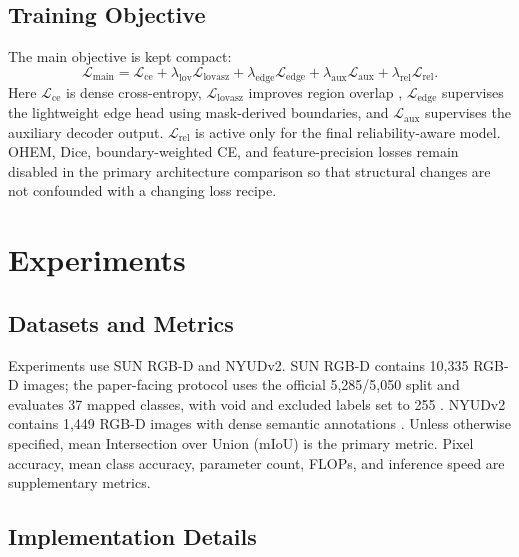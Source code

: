 \documentclass[a4paper,fleqn]{cas-dc}
\begin{document}
\subsection{Training Objective}

The main objective is kept compact:
\begin{equation}
  \mathcal{L}_{\mathrm{main}}
  =
  \mathcal{L}_{\mathrm{ce}}
  +\lambda_{\mathrm{lov}}\mathcal{L}_{\mathrm{lovasz}}
  +\lambda_{\mathrm{edge}}\mathcal{L}_{\mathrm{edge}}
  +\lambda_{\mathrm{aux}}\mathcal{L}_{\mathrm{aux}}
  +\lambda_{\mathrm{rel}}\mathcal{L}_{\mathrm{rel}}.
\end{equation}
Here $\mathcal{L}_{\mathrm{ce}}$ is dense cross-entropy, $\mathcal{L}_{\mathrm{lovasz}}$ improves region overlap \citep{berman2018lovasz}, $\mathcal{L}_{\mathrm{edge}}$ supervises the lightweight edge head using mask-derived boundaries, and $\mathcal{L}_{\mathrm{aux}}$ supervises the auxiliary decoder output. $\mathcal{L}_{\mathrm{rel}}$ is active only for the final reliability-aware model. OHEM, Dice, boundary-weighted CE, and feature-precision losses remain disabled in the primary architecture comparison so that structural changes are not confounded with a changing loss recipe.

\section{Experiments}\label{sec:experiments}

\subsection{Datasets and Metrics}

Experiments use SUN RGB-D and NYUDv2. SUN RGB-D contains 10,335 RGB-D images; the paper-facing protocol uses the official 5,285/5,050 split and evaluates 37 mapped classes, with void and excluded labels set to 255 \citep{song2015sun}. NYUDv2 contains 1,449 RGB-D images with dense semantic annotations \citep{silberman2012nyud}. Unless otherwise specified, mean Intersection over Union (mIoU) is the primary metric. Pixel accuracy, mean class accuracy, parameter count, FLOPs, and inference speed are supplementary metrics.

\subsection{Implementation Details}
\end{document}
